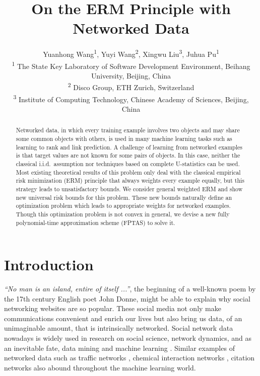 \documentclass[letterpaper]{article} %
\begin{document}
\title{On the ERM Principle with Networked Data}

\author{Yuanhong Wang\textsuperscript{1}, Yuyi Wang\textsuperscript{2}, Xingwu Liu\textsuperscript{3}, Juhua Pu\textsuperscript{1}\\
\textsuperscript{1} The State Key Laboratory of Software Development Environment, Beihang University, Beijing, China\\
\textsuperscript{2} Disco Group, ETH Zurich, Switzerland\\
\textsuperscript{3} Institute of Computing Technology, Chinese Academy of Sciences, Beijing, China
}

\maketitle

\begin{abstract}
Networked data, in which every training example involves two objects and may share some common objects with others, is used in many machine learning tasks such as learning to rank and link prediction. 
A challenge of learning from networked examples is that target values are not known for some pairs of objects. 
In this case, neither the classical i.i.d.\ assumption nor techniques based on complete U-statistics can be used. 
Most existing theoretical results of this problem only deal with the classical empirical risk minimization (ERM) principle that always weights every example equally, 
but this strategy leads to unsatisfactory bounds. 
We consider general weighted ERM and show new universal risk bounds for this problem. 
These new bounds naturally define an optimization problem which leads to appropriate weights for networked examples. 
Though this optimization problem is not convex in general, we devise a new fully polynomial-time approximation scheme (FPTAS) to solve it. 
\end{abstract}

\section{Introduction}
\label{sec:introduction}
\textit{``No man is an island, entire of itself ...''}, the beginning of a well-known poem by the 17th century English poet John Donne, might be able to explain why social networking websites are so popular. 
These social media not only make communications convenient and enrich our lives but also bring us data, of an unimaginable amount, that is intrinsically networked. 
Social network data nowadays is widely used in research on social science, network dynamics, and as an inevitable fate, data mining and machine learning \cite{scott2017social}. 
Similar examples of networked data such as traffic networks \cite{min2011real}, chemical interaction networks \cite{szklarczyk2014string}, citation networks \cite{dawson2014current} also abound throughout the machine learning world. 
\end{document}
